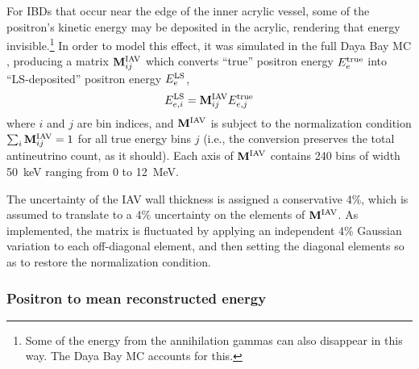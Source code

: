 \documentclass[../thesis.tex]{subfiles}
\begin{document}
For IBDs that occur near the edge of the inner acrylic vessel, some of the positron's kinetic energy may be deposited in the acrylic, rendering that energy invisible.\footnote{Some of the energy from the annihilation gammas can also disappear in this way. The Daya Bay MC accounts for this.} In order to model this effect, it was simulated in the full Daya Bay MC \cite{TruePromptSpec}, producing a matrix $\mathbf{M}^{\mathrm{IAV}}_{ij}$ which converts ``true'' positron energy $E^{\mathrm{true}}_{e}$ into ``LS-deposited'' positron energy $E^{\mathrm{LS}}_{e}$,
\begin{equation}
  \label{eq:Miav}
  E^{\mathrm{LS}}_{e,i} = \mathbf{M}^{\mathrm{IAV}}_{ij} E^{\mathrm{true}}_{e,j}
\end{equation}
where $i$ and $j$ are bin indices, and $\mathbf{M}^{\mathrm{IAV}}$ is subject to the normalization condition $\sum_i\mathbf{M}^{\mathrm{IAV}}_{ij} = 1$ for all true energy bins $j$ (i.e., the conversion preserves the total antineutrino count, as it should). Each axis of $\mathbf{M}^{\mathrm{IAV}}$ contains 240 bins of width 50~keV ranging from 0 to 12~MeV.

The uncertainty of the IAV wall thickness is assigned a conservative 4\%, which is assumed to translate to a 4\% uncertainty on the elements of $\mathbf{M}^{\mathrm{IAV}}$. As implemented, the matrix is fluctuated by applying an independent 4\% Gaussian variation to each off-diagonal element, and then setting the diagonal elements so as to restore the normalization condition.

\subsubsection{Positron to mean reconstructed energy}
\end{document}
